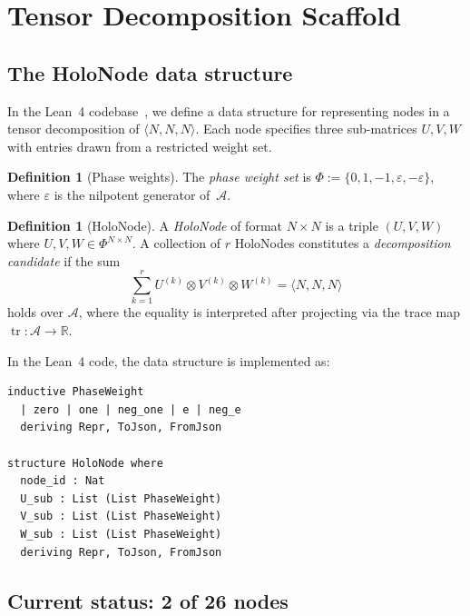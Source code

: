 \documentclass[11pt,a4paper]{article}
\theoremstyle{definition}
\newtheorem{definition}[theorem]{Definition}
\theoremstyle{remark}
\DeclareMathOperator{\tr}{tr}
\newcommand{\mmtensor}[3]{\langle #1, #2, #3 \rangle}
\begin{document}
\section{Tensor Decomposition Scaffold}\label{sec:scaffold}

\subsection{The HoloNode data structure}

In the Lean~4 codebase~\cite{SocrateAI2026}, we define a data
structure for representing nodes in a tensor decomposition of
$\mmtensor{N}{N}{N}$. Each node specifies three sub-matrices
$U, V, W$ with entries drawn from a restricted weight set.

\begin{definition}[Phase weights]\label{def:phase-weights}
The \emph{phase weight set} is
$\Phi := \{0, 1, -1, \varepsilon, -\varepsilon\}$,
where $\varepsilon$ is the nilpotent generator of~$\mathcal{A}$.
\end{definition}

\begin{definition}[HoloNode]\label{def:holonode}
A \emph{HoloNode} of format $N \times N$ is a triple
$(U, V, W)$ where $U, V, W \in \Phi^{N \times N}$. A collection
of $r$ HoloNodes constitutes a \emph{decomposition candidate}
if the sum
\begin{equation}\label{eq:decomposition}
  \sum_{k=1}^{r} U^{(k)} \otimes V^{(k)} \otimes W^{(k)}
  = \mmtensor{N}{N}{N}
\end{equation}
holds over $\mathcal{A}$, where the equality is interpreted
after projecting via the trace map $\tr \colon \mathcal{A}
\to \mathbb{R}$.
\end{definition}

In the Lean~4 code, the data structure is implemented as:
\begin{lstlisting}[language=Lean]
inductive PhaseWeight
  | zero | one | neg_one | e | neg_e
  deriving Repr, ToJson, FromJson

structure HoloNode where
  node_id : Nat
  U_sub : List (List PhaseWeight)
  V_sub : List (List PhaseWeight)
  W_sub : List (List PhaseWeight)
  deriving Repr, ToJson, FromJson
\end{lstlisting}

\subsection{Current status: 2 of 26 nodes}
\end{document}
